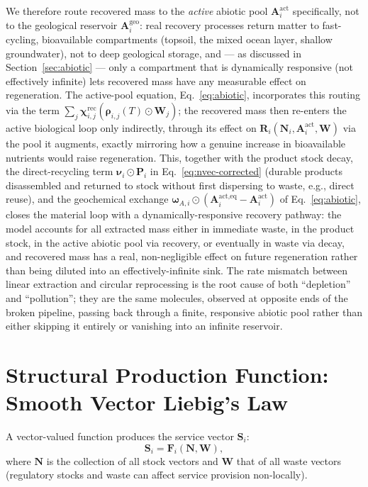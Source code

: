 \documentclass[twocolumn,10pt]{article}
\begin{document}
We therefore route recovered mass to the \emph{active} abiotic pool $\mathbf A^{\text{act}}_i$ specifically, not to the geological reservoir $\mathbf A^{\text{geo}}_i$: real recovery processes return matter to fast-cycling, bioavailable compartments (topsoil, the mixed ocean layer, shallow groundwater), not to deep geological storage, and — as discussed in Section~\ref{sec:abiotic} — only a compartment that is dynamically responsive (not effectively infinite) lets recovered mass have any measurable effect on regeneration. The active-pool equation, Eq.~\eqref{eq:abiotic}, incorporates this routing via the term $\sum_j\boldsymbol\chi^{\text{rec}}_{i,j}(\boldsymbol\rho_{i,j}(T)\odot\mathbf W_j)$; the recovered mass then re-enters the active biological loop only indirectly, through its effect on $\mathbf R_i(\mathbf N_i,\mathbf A^{\text{act}}_i,\mathbf W)$ via the pool it augments, exactly mirroring how a genuine increase in bioavailable nutrients would raise regeneration. This, together with the product stock decay, the direct-recycling term $\boldsymbol\nu_i\odot\mathbf P_i$ in Eq.~\eqref{eq:nvec-corrected} (durable products disassembled and returned to stock without first dispersing to waste, e.g., direct reuse), and the geochemical exchange $\boldsymbol\omega_{A,i}\odot(\mathbf A^{\text{act},\text{eq}}_i-\mathbf A^{\text{act}}_i)$ of Eq.~\eqref{eq:abiotic}, closes the material loop with a dynamically-responsive recovery pathway: the model accounts for all extracted mass either in immediate waste, in the product stock, in the active abiotic pool via recovery, or eventually in waste via decay, and recovered mass has a real, non-negligible effect on future regeneration rather than being diluted into an effectively-infinite sink. The rate mismatch between linear extraction and circular reprocessing is the root cause of both ``depletion'' and ``pollution''; they are the same molecules, observed at opposite ends of the broken pipeline, passing back through a finite, responsive abiotic pool rather than either skipping it entirely or vanishing into an infinite reservoir.

\section{Structural Production Function: Smooth Vector Liebig's Law}
\label{sec:structural-production}
A vector-valued function produces the service vector \(\mathbf{S}_i\):
\[
\mathbf{S}_i = \mathbf{F}_i(\mathbf{N},\mathbf{W}),
\]
where \(\mathbf{N}\) is the collection of all stock vectors and \(\mathbf{W}\) that of all waste vectors (regulatory stocks and waste can affect service provision non-locally).
\end{document}
